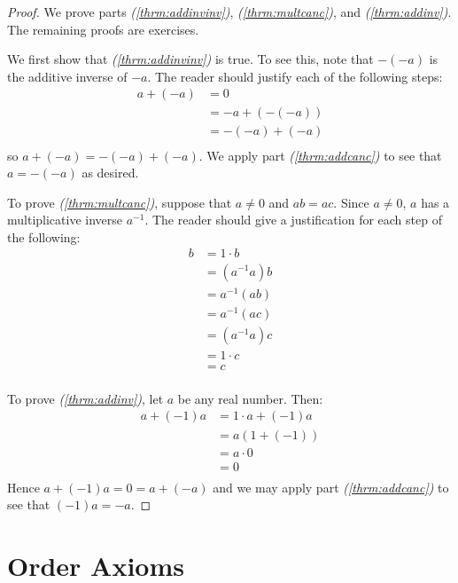 \begin{proof}
We prove parts  {\itshape (\ref{thrm:addinvinv})}, {\itshape (\ref{thrm:multcanc})}, and {\itshape (\ref{thrm:addinv})}. The remaining proofs are exercises.

We first show that {\itshape(\ref{thrm:addinvinv})} is true. To see this, note that $-(-a)$ is the additive inverse of $-a$. The reader should justify each of the following steps:
\begin{equation*}
\begin{split}
a+(-a)&=0\\
&=-a+(-(-a))\\
&=-(-a)+(-a)\\
\end{split}
\end{equation*}
so $a+(-a)=-(-a)+(-a)$. We apply part {\itshape(\ref{thrm:addcanc})} to see that $a=-(-a)$ as desired.

To prove {\itshape (\ref{thrm:multcanc})}, suppose that $a\neq 0$ and $ab=ac$. Since $a\neq0$, $a$ has a multiplicative inverse $a^{-1}$. The reader should give a justification for each step of the following:
\begin{equation*}
\begin{split}
b&=1\cdot b\\
&=(a^{-1}a)b\\
&=a^{-1}(ab)\\
&= a^{-1}(ac)\\
&=(a^{-1}a)c\\
&=1\cdot c\\
&=c\\
\end{split}
\end{equation*}

To prove {\itshape (\ref{thrm:addinv})}, let $a$ be any real number. Then:
\begin{equation*}
\begin{split}
a+(-1)a &= 1\cdot a+(-1)a\\
&=a(1+(-1))\\
&=a\cdot 0\\
&=0\\
\end{split}
\end{equation*}
Hence $a+(-1)a=0=a+(-a)$ and we may apply part {\itshape (\ref{thrm:addcanc})} to see that $(-1)a=-a$.
\end{proof}

\section{Order Axioms}

